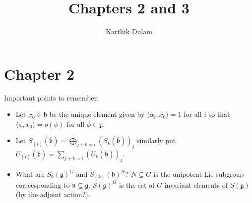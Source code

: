 \documentclass{article}
\title{Chapters 2 and 3}
\author{Karthik Dulam}
\theoremstyle{mytheoremstyle}
\theoremstyle{mytheoremstyle}
\theoremstyle{myproblemstyle}
\begin{document}
    \maketitle
   
\section{Chapter 2}

Important points to remember:
\begin{itemize}
  \item Let $x_0 \in \mathfrak{h}$ be the unique element given by $\langle \alpha_i, x_0 \rangle = 1$ for all $i$ so that 
    $\langle \phi, x_0 \rangle = o(\phi)$ for all $\phi \in \mathfrak{g}$.
  \item Let $S_{(i)}(\mathfrak{\overline b}) = \bigoplus_{j+k=i} (S_k(\mathfrak{\overline b}))_j$ similarly put 
    $U_{(i)}(\mathfrak{\overline b}) = \sum_{j+k=i} (U_k(\mathfrak{\overline b}))_j$.
  \item What are $S_k(\mathfrak{g})^G$ and $S_{(k)}(\mathfrak{b})^N$?
      $N \subseteq G$ is the unipotent Lie subgroup correesponding to $\mathfrak{n} \subseteq \mathfrak{g}$.
      $S(\mathfrak{g})^G$ is the set of $G$-invariant elements of $S(\mathfrak{g})$ (by the adjoint action?).
\end{itemize}
\end{document}
